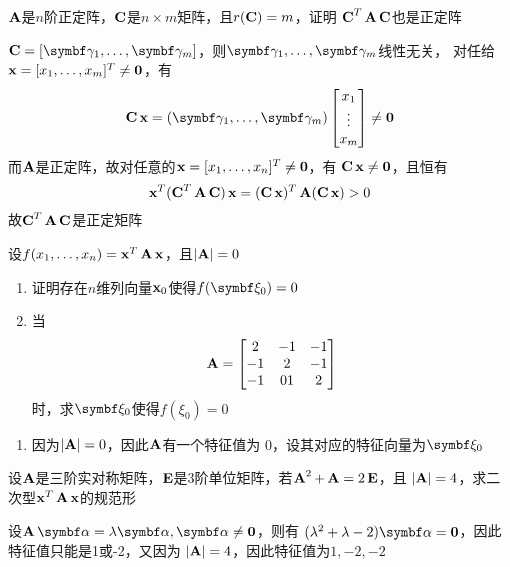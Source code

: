 \documentclass{article}
\begin{document}
\begin{examplle}[]
\(\bA\)是\(n\)阶正定阵，\(\bC\)是\(n\times m\)矩阵，且\(r(\bC)=m\)，证明
\(\bC^T\bA\bC\)也是正定阵

\(\bC=[\bgamma_1,\dots,\bgamma_m]\)，则\(\bgamma_1,\dots,\bgamma_m\)线性无关，
对任给\(\bx=[x_1,\dots,x_m]^T\neq\bzero\)，有
\begin{equation*}
\bC\bx=(\bgamma_1,\dots,\bgamma_m)
\begin{bmatrix}
x_1\\\vdots\\x_m
\end{bmatrix}\neq\bzero
\end{equation*}
而\(\bA\)是正定阵，故对任意的\(\bx=[x_1,\dots,x_n]^T\neq\bzero\)，有
\(\bC\bx\neq\bzero\)，且恒有
\begin{equation*}
\bx^T(\bC^T\bA\bC)\bx=(\bC\bx)^T\bA(\bC\bx)>0
\end{equation*}
故\(\bC^T\bA\bC\)是正定矩阵
\end{examplle}

\begin{examplle}[]
设\(f(x_1,\dots,x_n)=\bx^T\bA\bx\)，且\(\abs{\bA}=0\)
\begin{enumerate}
\item 证明存在\(n\)维列向量\(\bx_0\)使得\(f(\bxi_0)=0\)
\item 当
\begin{equation*}
\bA=
\begin{bmatrix}
2&-1&-1\\
-1&2&-1\\
-1&01&2
\end{bmatrix}
\end{equation*}
时，求\(\bxi_0\)使得\(f(\xi_0)=0\)
\end{enumerate}


\begin{enumerate}
\item 因为\(\abs{\bA}=0\)，因此\(\bA\)有一个特征值为 0，设其对应的特征向量为\(\bxi_0\)
\end{enumerate}
\end{examplle}

\begin{examplle}[]
设\(\bA\)是三阶实对称矩阵，\(\bE\)是3阶单位矩阵，若\(\bA^2+\bA=2\bE\)，且
\(\abs{\bA}=4\)，求二次型\(\bx^T\bA\bx\)的规范形

设\(\bA\balpha=\lambda\balpha,\balpha\neq\bzero\)，则有
\((\lambda^2+\lambda-2)\balpha=\bzero\)，因此特征值只能是1或-2，又因为
\(\abs{\bA}=4\)，因此特征值为\(1,-2,-2\)
\end{examplle}
\end{document}
